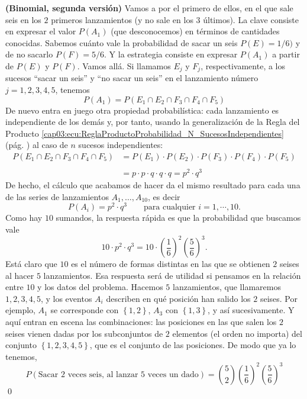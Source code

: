 \begin{Ejemplo}{\bf (Binomial, segunda versión)}
        Vamos a por el primero de ellos, en el que sale seis en los $2$  primeros lanzamientos (y no sale en los $3$ \'ultimos). La clave consiste en expresar el valor $P(A_1)$ (que desconocemos) en términos de cantidades conocidas. Sabemos cuánto vale la probabilidad de sacar un seis $P(E)=1/6)$ y de no sacarlo $P(F)=5/6$. Y la estrategia consiste en expresar $P(A_1)$ a partir de $P(E)$ y $P(F)$. Vamos allá. Si llamamos $E_j$ y $F_j$, respectivamente, a los sucesos ``sacar un seis'' y ``no sacar un seis''  en el lanzamiento n\'umero $j=1,2,3,4,5$, tenemos
          	\[P(A_1)=P(E_1\cap E_2 \cap F_3\cap F_4\cap F_5)\]
        De nuevo entra en juego otra propiedad probabilística: cada lanzamiento es independiente de los dem\'as y, por tanto, usando la generalización de la Regla del Producto \ref{cap03:ecu:ReglaProductoProbabilidad_N_SucesosIndependientes} (pág. \pageref{cap03:ecu:ReglaProductoProbabilidad_N_SucesosIndependientes}) al caso de $n$ sucesos independientes:
          	\[\begin{array}{rl}
          	P(E_1\cap E_2 \cap F_3\cap F_4\cap F_5)& =P(E_1)\cdot P( E_2 )\cdot P( F_3)\cdot P( F_4)
          	\cdot P( F_5) \\
          	& \\
          	& =p\cdot p \cdot q \cdot q \cdot q = p^2\cdot q^3
          	\end{array}\]
        De hecho, el c\'alculo que acabamos de hacer da el mismo resultado para cada una           	de las series de lanzamientos $A_1,\ldots,A_{10}$, es decir
          		\[P(A_i)=p^2\cdot q^3 \qquad \text{para cualquier }i=1,\cdots,10. \]
        Como hay $10$ sumandos, la respuesta r\'apida es que la probabilidad que buscamos vale
          		\[10\cdot p^2\cdot q^3=10\cdot\left( \dfrac{1}{6}\right)^2\left(\dfrac{5}{6}\right)^3. \]	
          	Est\'a claro que $10$ es el n\'umero de formas distintas en las que se obtienen $2$ seises
          	al hacer $5$ lanzamientos.
          	Esa respuesta ser\'a de utilidad si pensamos en la relaci\'on entre $10$
          	y los datos del problema. Hacemos $5$ lanzamientos, que llamaremos $1,2,3,4,5$,
          	y los eventos $A_i$ 	describen en qu\'e posici\'on han salido los $2$ seises.
          	Por ejemplo, $A_1$ se corresponde con $\left\{1,2\right\}$, $A_3$ con $\left\{1,3\right\}$,
          	y as\'i sucesivamente. Y aqu\'i entran en escena las combinaciones:
          	las posiciones en las que salen los $2$ seises vienen dadas por los
          	subconjuntos de $2$ elementos (el orden no importa) del conjunto
          	 $\left\{1,2,3,4,5\right\}$, que es el conjunto 	de las posiciones.
          	De modo que ya lo tenemos,
          		\[P(\text{Sacar $2$ veces seis, al lanzar $5$ veces un dado})=
          		\binom{5}{2}\left( \dfrac{1}{6}\right)^2\left(\dfrac{5}{6}\right)^3\]
          \qed
\end{Ejemplo}
